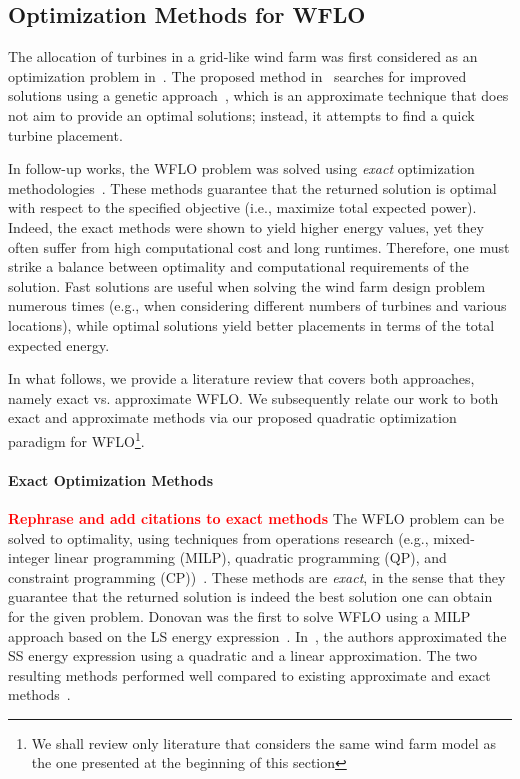 \documentclass[preprint,12pt]{elsarticle}
\newcommand{\todo}[1]{{\textcolor{red}{\bf {#1}}}}
\begin{document}
\subsection{Optimization Methods for WFLO}

The allocation of turbines in a grid-like wind farm was first considered 
as an optimization problem in~\cite{MOSETTI1994105}. The proposed method in~\cite{MOSETTI1994105}
searches for improved solutions using a 
genetic approach~\cite{davis1991handbook},
which is an approximate technique 
that does not aim to provide an optimal solutions;
instead, it attempts to find a quick turbine placement.


In follow-up works, 
the WFLO problem was solved using \emph{exact}  
optimization methodologies~\cite{turner2014new,Zhang2014}. 
These methods guarantee that the returned solution is optimal with respect
to the specified objective (i.e., maximize total expected power). 
Indeed, the exact methods were shown to yield higher energy values, yet they often suffer from 
high computational cost and long runtimes. Therefore, one must strike a balance between optimality and computational requirements of the solution. 
Fast solutions are useful when solving the wind farm design problem numerous times (e.g., when considering different numbers of turbines and various locations),
while optimal solutions yield better placements in terms of the total expected energy.

In what follows, we provide a literature review that covers both approaches, namely exact vs. approximate WFLO.
We subsequently relate our 
work to both exact and approximate methods via our proposed quadratic optimization paradigm for WFLO\footnote{We shall review 
only literature that considers the same wind farm model as the one presented at the beginning of this section}. 
 
\paragraph{Exact Optimization Methods} 
\todo{Rephrase and add citations to exact methods}
The WFLO problem can be solved  
to optimality, using
techniques from operations research (e.g., mixed-integer linear programming (MILP), quadratic programming (QP), and constraint programming (CP))~\cite{}.
These methods are \emph{exact}, in the sense that they guarantee that the returned solution is indeed
the best solution one can obtain for the given problem. Donovan was the first to solve WFLO using a
MILP approach based on the LS energy expression~\cite{donovan2005wind}. In~\cite{turner2014new}, the authors
approximated the SS energy expression using a quadratic and a linear approximation. The two resulting methods performed well
compared to existing approximate and exact methods~\cite{turner2014new}. 
\end{document}

